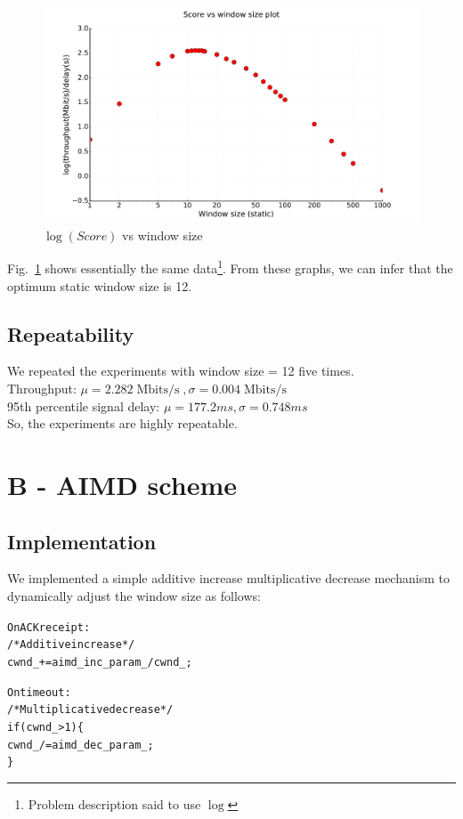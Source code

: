 \documentclass{article}
\DeclareMathOperator{\mbps}{Mbits/s}
\begin{document}
\begin{figure}[h]
\includegraphics[width=\columnwidth]{"../A/A-score-log"}
\caption{$\log(Score)$ vs window size}
\label{A-score-log}
\end{figure}
Fig.~\ref{A-score-log} shows essentially the same
data\footnote{Problem description said to use $\log$}. From these
graphs, we can infer that the optimum static window size is 12.

\subsection{Repeatability}
We repeated the experiments with window size = 12 five times.\\
Throughput: $\mu = 2.282 \mbps, \sigma = 0.004 \mbps$ \\
95th percentile signal delay: $\mu = 177.2 ms, \sigma = 0.748 ms$\\
So, the experiments are highly repeatable.

\clearpage
\section{B - AIMD scheme}
\subsection{Implementation}
We implemented a simple additive increase multiplicative decrease
mechanism to dynamically adjust the window size as follows:
\begin{alltt}
  On ACK receipt:
    /* Additive increase */
    cwnd_ += aimd_inc_param_/cwnd_;

  On timeout:
    /* Multiplicative decrease */
    if (cwnd_ > 1) \{
      cwnd_ /= aimd_dec_param_;
    \}
\end{alltt}
\end{document}
